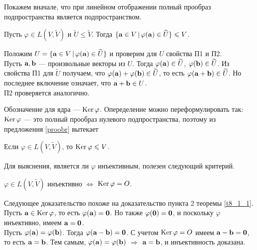 Покажем вначале, что при линейном отображении полный прообраз подпространства является подпространством.

\begin{predl}\label{proobr}
Пусть $\varphi \in L(V, \widetilde{V})$ и  $\widetilde{U}\leq \widetilde{V}$.
Тогда 
$\{ \mathbf{a} \in V \, | \, \varphi (\mathbf{a}) \in \widetilde{U} \} \leqslant V$.
\end{predl}
\dok Положим $U=\{ \mathbf{a} \in V \, | \, \varphi (\mathbf{a}) \in \widetilde{U} \}$ и проверим для $U$ свойства П1 и П2.\\
Пусть $ \mathbf{a}, \mathbf{b}$ --- произвольные векторы из $U$. Тогда 
$\varphi(\mathbf{a})\in \widetilde{U}$, $\varphi(\mathbf{b})\in \widetilde{U}$. Из свойства П1 для 
$\widetilde{U}$ получаем, что $\varphi(\mathbf{a})+\varphi(\mathbf{b})\in \widetilde{U}$, то есть
$\varphi(\mathbf{a}+\mathbf{b})\in \widetilde{U}$. Но последнее включение означает, что $\mathbf{a}+\mathbf{b}\in U$.\\
П2 проверяется аналогично.
\edok


Обозначение для ядра --- $\mathop{\rm Ker}\nolimits \varphi$. %
Опеределение можно переформулировать так: $\mathop{\rm Ker}\nolimits \varphi$ --- это полный прообраз нулевого подпространства,
поэтому из предложения \ref{proobr} вытекает


\begin{sled}\label{Ker}
Если $\varphi \in L(V, \widetilde{V})$, то $\mathop{\rm Ker}\nolimits \varphi \leqslant V$. %
\end{sled}




\otstup 

Для выяснения, является ли $\varphi$ инъективным, полезен следующий критерий.

\begin{predl}\label{p8_2_2}
$\varphi \in L(V, \widetilde{V})$ инъективно $\Leftrightarrow$ $\mathop{\rm Ker}\nolimits \varphi = O$.
\end{predl}
\dok 
Следующее доказательство похоже на доказательство пункта 2 теоремы \ref{t8_1_1}.\\
\dokright Пусть $\mathbf{a}\in \mathop{\rm Ker}\nolimits \varphi $, то есть $\varphi  (\mathbf{a})=\mathbf{0}$.
Но также $\varphi  (\mathbf{0})=\mathbf{0}$, и поскольку $\varphi$ инъективно, имеем $\mathbf{a}=\mathbf{0}$.\\
\dokright Пусть $\varphi  (\mathbf{a})=\varphi  (\mathbf{b})$. Тогда $\varphi  (\mathbf{a}-\mathbf{b})=\mathbf{0}$.
С учетом $\mathop{\rm Ker}\nolimits \varphi = O$ имеем $\mathbf{a}-\mathbf{b}=\mathbf{0}$, то есть $\mathbf{a}=\mathbf{b}$.
Тем самым, $\varphi  (\mathbf{a})=\varphi  (\mathbf{b})$ $\Rightarrow$ $\mathbf{a}=\mathbf{b}$, и инъективность доказана.
\edok


